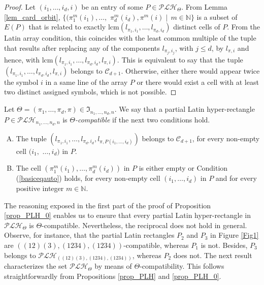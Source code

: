 \documentclass{article}
\begin{document}
\begin{proof} Let $(i_1,\ldots,i_d,i)$ be an entry of some \mbox{$P\in\mathcal{PLH}_{\Theta}$}. From Lemma \ref{lem_card_orbit}, $\{(\pi_1^m(i_1),\ldots,$ 
$\pi_d^m(i_d),\pi^m(i)\mid\, m\in\mathbb{N}\}$ is a subset of $E(P)$ that is related to exactly $\mathrm{lcm}(l_{\pi_1,i_1},\ldots,l_{\pi_d,i_d})$ distinct cells of $P$. From the Latin array condition, this coincides with the least common multiple of the tuple that results after replacing any of the components $l_{\pi_j,i_j}$, with $j\leq d$, by $l_{\pi,i}$ and hence, with $\mathrm{lcm}(l_{\pi_1,i_1},\ldots,l_{\pi_d,i_d},l_{\pi,i})$. This is equivalent to say that the tuple $(l_{\pi_1,i_1},\ldots,l_{\pi_d,i_d},l_{\pi,i})$ belongs to $\mathcal{C}_{d+1}$. Otherwise, either there would appear twice the symbol $i$ in a same line of the array $P$ or there would exist a cell with at least two distinct assigned symbols, which is not possible.
\end{proof}

Let $\Theta=(\pi_1,\ldots,\pi_d,\pi)\in \mathfrak{I}_{n_1,\ldots,n_d,n}$. We say that a partial Latin hyper-rectangle $P\in \mathcal{PLH}_{n_1,\ldots,n_d,n}$ is {\em $\Theta$-compatible} if the next two conditions hold.
\begin{enumerate}[C.1)]
\item The tuple $(l_{\pi_1,i_1},\ldots,l_{\pi_d,i_d},l_{\pi,P(i_1,\ldots,i_d)})$ belongs to $\mathcal{C}_{d+1}$, for every non-empty cell $(i_1,$ $\ldots,i_d)$ in $P$.
\item The cell $(\pi_1^m(i_1),\ldots,\pi_d^m(i_d))$ in $P$ is either empty or Condition (\ref{basiceqauto}) holds, for every non-empty cell $(i_1,\ldots,i_d)$ in $P$ and for every 
positive integer $m\in \mathbb{N}$.
\end{enumerate}

The reasoning exposed in the first part of the proof of Proposition \ref{prop_PLH_0} enables us to ensure that every partial Latin hyper-rectangle in $\mathcal{PLH}_{\Theta}$ is $\Theta$-compatible. Nevertheless, the reciprocal does not hold in general. Observe, for instance, that the partial Latin rectangles $P_2$ and $P_3$ in Figure \ref{Fig1} are $((12)(3),(1234),(1234))$-compatible, whereas $P_1$ is not. Besides, $P_3$ belongs to $\mathcal{PLH}_{((12)(3),(1234),(1234))}$, whereas $P_2$ does not. The next result characterizes the set $\mathcal{PLH}_{\Theta}$ by means of $\Theta$-compatibility. This follows straightforwardly from Propositions \ref{prop_PLH} and \ref{prop_PLH_0}.
\end{document}
